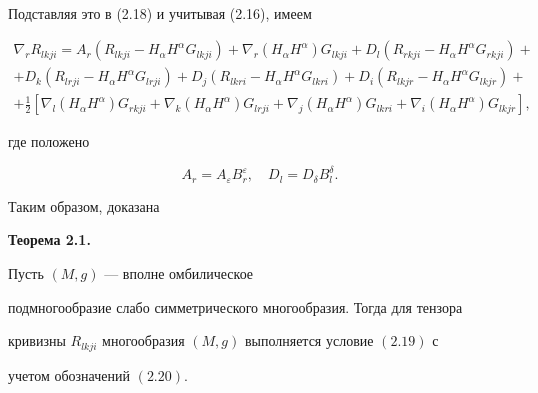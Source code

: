 $$


Подставляя это в (2.18) и учитывая (2.16), имеем


\begin{multline}


\nabla_r R_{lkji}=A_r(R_{lkji}-H_\alpha H^\alpha G_{lkji})+


\nabla_r(H_\alpha H^\alpha)G_{lkji}+


D_l(R_{rkji}-H_\alpha H^\alpha G_{rkji})+ \\


%


+D_k(R_{lrji}-H_\alpha H^\alpha G_{lrji})+


D_j(R_{lkri}-H_\alpha H^\alpha G_{lkri})+


D_i(R_{lkjr}-H_\alpha H^\alpha G_{lkjr}) + \\


%


+\frac{1}{2}[\nabla_l(H_\alpha H^\alpha)G_{rkji}+


\nabla_k(H_\alpha H^\alpha)G_{lrji}+\nabla_j


(H_\alpha H^\alpha)G_{lkri}+\nabla_i


(H_\alpha H^\alpha)G_{lkjr}],\tag{2.19}


\end{multline}


где положено


\begin{equation}


A_r=A_\varepsilon B^\varepsilon_r,\quad


D_l=D_\delta B^\delta_l.\tag{2.20}


\end{equation}





Таким образом, доказана


\medskip





{\bf Теорема 2.1.} {\it


Пусть $(M,g)$ --- вполне омбилическое


подмногообразие слабо симметрического многообразия. Тогда для тензора


кривизны $R_{lkji}$ многообразия $(M,g)$ выполняется условие $(2.19)$ с


учетом обозначений $(2.20)$.


}


\medskip





